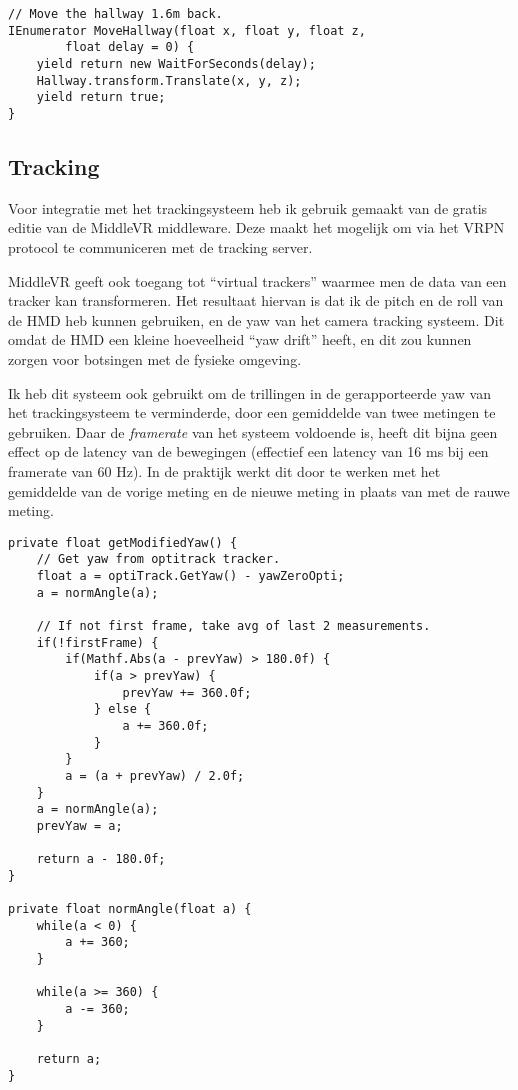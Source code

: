 \begin{verbatim}
// Move the hallway 1.6m back.
IEnumerator MoveHallway(float x, float y, float z, 
        float delay = 0) {
    yield return new WaitForSeconds(delay);
    Hallway.transform.Translate(x, y, z);
    yield return true;
}
\end{verbatim}

\subsection{Tracking}
Voor integratie met het trackingsysteem heb ik gebruik gemaakt van de gratis
editie van de MiddleVR middleware\cite{middlevr}. Deze maakt het mogelijk om via 
het VRPN protocol te communiceren met de tracking server.

MiddleVR geeft ook toegang tot ``virtual trackers'' waarmee men de data van een
tracker kan transformeren. Het resultaat hiervan is dat ik de pitch en de roll
van de HMD heb kunnen gebruiken, en de yaw van het camera tracking systeem. Dit
omdat de HMD een kleine hoeveelheid ``yaw drift'' heeft, en dit zou kunnen zorgen
voor botsingen met de fysieke omgeving.

Ik heb dit systeem ook gebruikt om de trillingen in de gerapporteerde yaw van het
trackingsysteem te verminderde, door een gemiddelde van twee metingen te
gebruiken. Daar de \emph{framerate} van het systeem voldoende is, heeft dit bijna 
geen effect op de latency van de bewegingen (effectief een latency van 16 ms bij
een framerate van 60 Hz). In de praktijk werkt dit door te werken met het 
gemiddelde van de vorige meting en de nieuwe meting in plaats van met de rauwe 
meting.

\begin{verbatim}
private float getModifiedYaw() {
    // Get yaw from optitrack tracker.
    float a = optiTrack.GetYaw() - yawZeroOpti;
    a = normAngle(a);

    // If not first frame, take avg of last 2 measurements.
    if(!firstFrame) {
        if(Mathf.Abs(a - prevYaw) > 180.0f) {
            if(a > prevYaw) {
                prevYaw += 360.0f;
            } else {
                a += 360.0f;
            }
        }
        a = (a + prevYaw) / 2.0f;
    }
    a = normAngle(a);
    prevYaw = a;

    return a - 180.0f;
}

private float normAngle(float a) {
    while(a < 0) {
        a += 360;
    }

    while(a >= 360) {
        a -= 360;
    }

    return a;
}
\end{verbatim}

